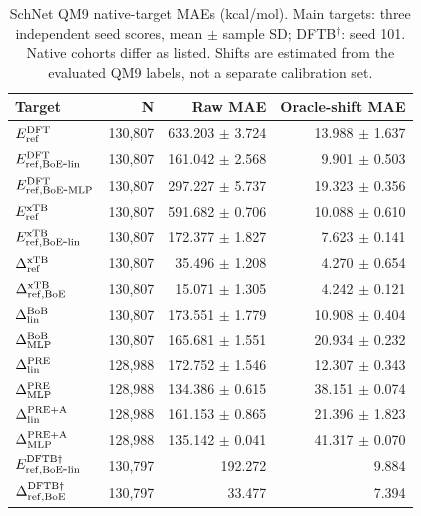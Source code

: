 \begin{table}[H]
\centering
\scriptsize
\setlength{\tabcolsep}{4pt}
\renewcommand{\arraystretch}{1.35}
\caption{SchNet QM9 native-target MAEs (kcal/mol). Main targets: three independent seed scores, mean $\pm$ sample SD; DFTB$^\dagger$: seed 101. Native cohorts differ as listed. Shifts are estimated from the evaluated QM9 labels, not a separate calibration set.}
\begin{tabular}{lrrr}
\toprule
Target & N & Raw MAE & Oracle-shift MAE \\
\midrule
\(E_{\rm ref}^{\rm DFT}\) & 130,807 & 633.203 $\pm$ 3.724 & 13.988 $\pm$ 1.637 \\
\(E_{\rm ref,BoE\mbox{-}lin}^{\rm DFT}\) & 130,807 & 161.042 $\pm$ 2.568 & 9.901 $\pm$ 0.503 \\
\(E_{\rm ref,BoE\mbox{-}MLP}^{\rm DFT}\) & 130,807 & 297.227 $\pm$ 5.737 & 19.323 $\pm$ 0.356 \\
\(E_{\rm ref}^{\rm xTB}\) & 130,807 & 591.682 $\pm$ 0.706 & 10.088 $\pm$ 0.610 \\
\(E_{\rm ref,BoE\mbox{-}lin}^{\rm xTB}\) & 130,807 & 172.377 $\pm$ 1.827 & 7.623 $\pm$ 0.141 \\
\(\Delta^{\rm xTB}_{\rm ref}\) & 130,807 & 35.496 $\pm$ 1.208 & 4.270 $\pm$ 0.654 \\
\(\Delta^{\rm xTB}_{\rm ref,BoE}\) & 130,807 & 15.071 $\pm$ 1.305 & 4.242 $\pm$ 0.121 \\
\(\Delta^{\rm BoB}_{\rm lin}\) & 130,807 & 173.551 $\pm$ 1.779 & 10.908 $\pm$ 0.404 \\
\(\Delta^{\rm BoB}_{\rm MLP}\) & 130,807 & 165.681 $\pm$ 1.551 & 20.934 $\pm$ 0.232 \\
\(\Delta^{\rm PRE}_{\rm lin}\) & 128,988 & 172.752 $\pm$ 1.546 & 12.307 $\pm$ 0.343 \\
\(\Delta^{\rm PRE}_{\rm MLP}\) & 128,988 & 134.386 $\pm$ 0.615 & 38.151 $\pm$ 0.074 \\
\(\Delta^{\rm PRE+A}_{\rm lin}\) & 128,988 & 161.153 $\pm$ 0.865 & 21.396 $\pm$ 1.823 \\
\(\Delta^{\rm PRE+A}_{\rm MLP}\) & 128,988 & 135.142 $\pm$ 0.041 & 41.317 $\pm$ 0.070 \\
\(E_{\rm ref,BoE\mbox{-}lin}^{\rm DFTB\dagger}\) & 130,797 & 192.272 & 9.884 \\
\(\Delta^{\rm DFTB\dagger}_{\rm ref,BoE}\) & 130,797 & 33.477 & 7.394 \\
\bottomrule
\end{tabular}
\end{table}
